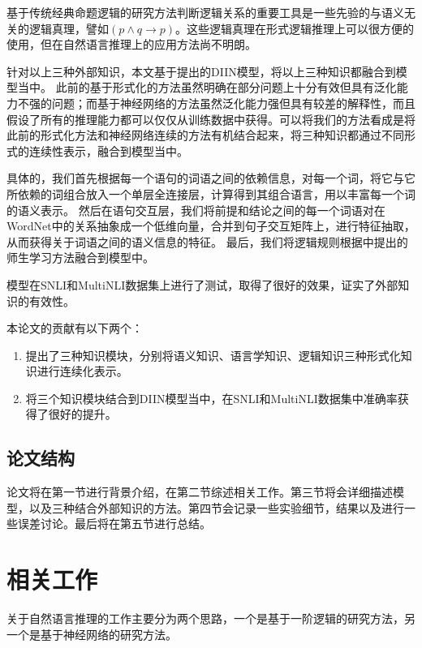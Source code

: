 \documentclass[UTF8,11pt,a4paper,nofonts]{ctexart}
\begin{document}
基于传统经典命题逻辑的研究方法判断逻辑关系的重要工具是一些先验的与语义无关的逻辑真理，譬如$(p\land q \to p)$。这些逻辑真理在形式逻辑推理上可以很方便的使用，但在自然语言推理上的应用方法尚不明朗。

针对以上三种外部知识，本文基于\cite{yichen2018nli}提出的DIIN模型，将以上三种知识都融合到模型当中。
此前的基于形式化的方法虽然明确在部分问题上十分有效但具有泛化能力不强的问题；而基于神经网络的方法虽然泛化能力强但具有较差的解释性，而且假设了所有的推理能力都可以仅仅从训练数据中获得。可以将我们的方法看成是将此前的形式化方法和神经网络连续的方法有机结合起来，将三种知识都通过不同形式的连续性表示，融合到模型当中。

具体的，我们首先根据每一个语句的词语之间的依赖信息，对每一个词，将它与它所依赖的词组合放入一个单层全连接层，计算得到其组合语言，用以丰富每一个词的语义表示。
然后在语句交互层，我们将前提和结论之间的每一个词语对在WordNet中的关系抽象成一个低维向量，合并到句子交互矩阵上，进行特征抽取，从而获得关于词语之间的语义信息的特征。
最后，我们将逻辑规则根据\cite{Hu2016HarnessingDN}中提出的师生学习方法融合到模型中。

模型在SNLI和MultiNLI数据集上进行了测试，取得了很好的效果，证实了外部知识的有效性。

本论文的贡献有以下两个：

\begin{enumerate}
\item 提出了三种知识模块，分别将语义知识、语言学知识、逻辑知识三种形式化知识进行连续化表示。
\item 将三个知识模块结合到DIIN模型当中，在SNLI和MultiNLI数据集中准确率获得了很好的提升。
\end{enumerate}



\subsection{论文结构}

论文将在第一节进行背景介绍，在第二节综述相关工作。第三节将会详细描述模型，以及三种结合外部知识的方法。第四节会记录一些实验细节，结果以及进行一些误差讨论。最后将在第五节进行总结。

\newpage
\section{相关工作}

关于自然语言推理的工作主要分为两个思路，一个是基于一阶逻辑的研究方法，另一个是基于神经网络的研究方法。
\end{document}
